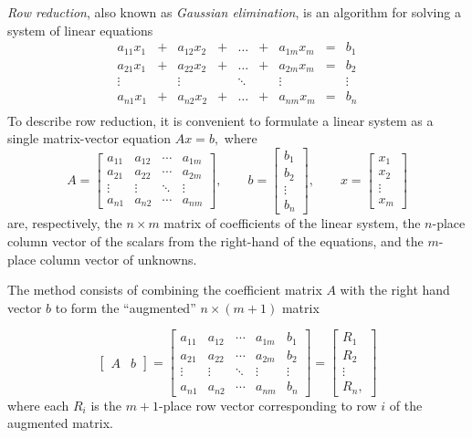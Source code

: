 \documentclass[12pt]{article}
\begin{document}
\emph{Row reduction}, also known as \emph{Gaussian elimination}, is an algorithm for solving a system of linear equations
\[
\begin{array}{ccccccccl}
a_{11} x_1 &+ &a_{12} x_2 &+ &\ldots &+ &a_{1m} x_m &=& b_1 \\
a_{21} x_1 &+ &a_{22} x_2 &+ &\ldots &+ &a_{2m} x_m &=& b_2 \\
\vdots & & \vdots & & \ddots && \vdots && \vdots\\
a_{n1} x_1 &+ &a_{n2} x_2 &+ &\ldots &+ &a_{nm} x_m &=& b_n \\
\end{array}
\]
To describe row reduction, it is convenient to formulate a linear
system as a single matrix-vector equation $Ax = b,$ where
\[
A = \begin{bmatrix}
a_{11} & a_{12} & \cdots & a_{1m} \\
a_{21} & a_{22} & \cdots & a_{2m} \\
\vdots & \vdots & \ddots & \vdots \\
a_{n1} & a_{n2} & \cdots & a_{nm}
\end{bmatrix}, \qquad
b = \begin{bmatrix}
b_1 \\ b_2 \\ \vdots \\ b_n
\end{bmatrix},  \qquad
x = \begin{bmatrix}
x_1 \\ x_2 \\ \vdots \\ x_m
\end{bmatrix}
\]
are, respectively, the $n\times m$ matrix of coefficients of the
linear system, the $n$-place column vector of the scalars from the
right-hand of the equations, and the $m$-place column vector of
unknowns.

The method consists of combining the coefficient matrix $A$ with the
right hand vector $b$ to form the ``augmented'' $n \times (m + 1)$ matrix

$$ \begin{bmatrix} A & b \end{bmatrix} =
\begin{bmatrix}
a_{11} & a_{12} & \cdots & a_{1m} & b_1 \\
a_{21} & a_{22} & \cdots & a_{2m} & b_2 \\
\vdots & \vdots & \ddots & \vdots & \vdots \\
a_{n1} & a_{n2} & \cdots & a_{nm} & b_n
\end{bmatrix} =
\begin{bmatrix}
  R_1 \\ R_2 \\ \vdots \\ R_n,
\end{bmatrix}
$$
where each $R_i$ is the $m+1$-place row vector corresponding to row
$i$ of the augmented matrix.
\end{document}
